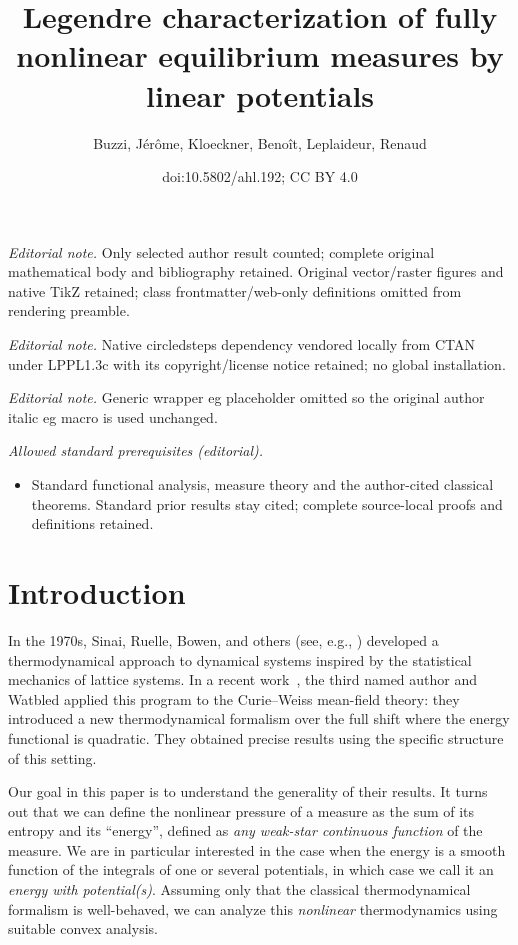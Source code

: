 \documentclass[10pt]{amsart}
\title{Legendre characterization of fully nonlinear equilibrium measures by linear potentials}
\author{Buzzi, Jérôme, Kloeckner, Benoît, Leplaideur, Renaud}
\date{doi:10.5802/ahl.192; CC BY 4.0}
\theoremstyle{definition}\newtheorem{defi}[theo]{Definition}\newtheorem{rema}[theo]{Remark}\newtheorem{exam}[theo]{Example}\newtheorem{exem}[theo]{Example}\newtheorem{nota}[theo]{Notation}
\theoremstyle{plain}
\theoremstyle{plain}
\newcounter{In}
\newcommand*\8{\infty}
\begin{document}
\maketitle
\noindent\textit{Editorial note.} Only selected author result counted; complete original mathematical body and bibliography retained. Original vector/raster figures and native TikZ retained; class frontmatter/web-only definitions omitted from rendering preamble.\par\medskip
\noindent\textit{Editorial note.} Native circledsteps dependency vendored locally from CTAN under LPPL1.3c with its copyright/license notice retained; no global installation.\par\medskip
\noindent\textit{Editorial note.} Generic wrapper eg placeholder omitted so the original author italic eg macro is used unchanged.\par\medskip
\noindent\textit{Allowed standard prerequisites (editorial).}\begin{itemize}
\item Standard functional analysis, measure theory and the author-cited classical theorems. Standard prior results stay cited; complete source-local proofs and definitions retained.
\end{itemize}\medskip



\section{Introduction}

In the 1970s, Sinai, Ruelle, Bowen, and others (see, e.g., \cite{Bowen-book,Ruelle-book,Sinai-GibbsMeasures}) developed a thermodynamical approach to dynamical systems inspired by the statistical mechanics of lattice systems. In a recent work~\cite{Leplaideur-Watbled}, the third named author and Watbled applied this program to the Curie--Weiss mean-field theory: they introduced a new thermodynamical formalism over the full shift where the energy functional is quadratic. They obtained precise results using the specific structure of this setting.

Our goal in this paper is to understand the generality of their results. It turns out that we can define the nonlinear pressure of a measure as the sum of its entropy and its ``energy'', defined as \emph{any weak-star continuous function} of the measure. We are in particular interested in the case when the energy is a smooth function of the integrals of one or several potentials, in which case we call it an \emph{energy with potential(s)}. Assuming only that the classical thermodynamical formalism is well-behaved, we can analyze this \emph{nonlinear} thermodynamics using suitable convex analysis.
\end{document}
